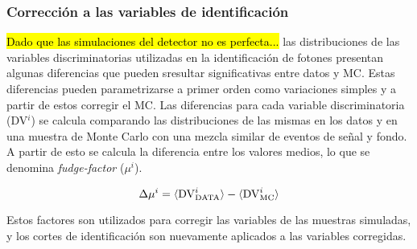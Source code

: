 


\subsubsection{Corrección a las variables de identificación}


\hl{Dado que las simulaciones del detector no es perfecta...}
las distribuciones de las variables discriminatorias utilizadas en la identificación
de fotones presentan algunas diferencias que pueden sresultar significativas entre datos y MC.
Estas diferencias pueden parametrizarse a primer orden como variaciones simples
y a partir de estos corregir el MC.
Las diferencias para cada variable discriminatoria (DV$^i$) se calcula
comparando las distribuciones de las mismas en los datos y en una muestra de
Monte Carlo con una mezcla similar de eventos de señal y fondo.
A partir de esto se calcula la diferencia
entre los valores medios, lo que se denomina \emph{fudge-factor} ($\mu^i$)\cite{ATLAS-CONF-2012-123}.

\begin{equation}
  \Delta \mu^i = \langle \mathrm{DV}^i_\text{DATA} \rangle - \langle \mathrm{DV}^i_\mathrm{MC} \rangle
\end{equation}

Estos factores son utilizados para corregir las variables de las
muestras simuladas, y los cortes de identificación son nuevamente
aplicados a las variables corregidas.



